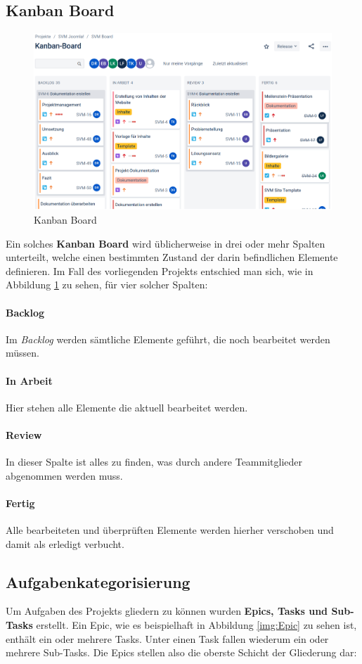\documentclass[12pt,a4paper]{article}
\begin{document}
\subsection{Kanban Board}
\begin{figure}[htbp]
  \includegraphics[width=\textwidth]{KanbanSVM.png}
  \caption{Kanban Board}
  \label{img:KanbanBoard}
\end{figure}
Ein solches \textbf{Kanban Board} wird üblicherweise in drei oder mehr Spalten unterteilt, welche einen bestimmten Zustand der darin befindlichen Elemente definieren. Im Fall des vorliegenden Projekts entschied man sich, wie in Abbildung \ref{img:KanbanBoard} zu sehen, für vier solcher Spalten:
\paragraph{Backlog} Im \textit{Backlog} werden sämtliche Elemente geführt, die noch bearbeitet werden müssen.
\paragraph{In Arbeit} Hier stehen alle Elemente die aktuell bearbeitet werden.
\paragraph{Review} In dieser Spalte ist alles zu finden, was durch andere Teammitglieder abgenommen werden muss.
\paragraph{Fertig} Alle bearbeiteten und überprüften Elemente werden hierher verschoben und damit als erledigt verbucht.


\subsection{Aufgabenkategorisierung}
Um Aufgaben des Projekts gliedern zu können wurden \textbf{Epics, Tasks und Sub-Tasks} erstellt.
Ein Epic, wie es beispielhaft in Abbildung \ref{img:Epic} zu sehen ist, enthält ein oder mehrere Tasks. Unter einen Task fallen wiederum ein oder mehrere Sub-Tasks. Die Epics stellen also die oberste Schicht der Gliederung dar:
\end{document}
